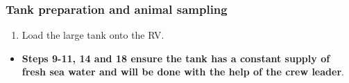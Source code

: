\documentclass[
  12pt,
]{report}
\providecommand{\tightlist}{%
  \setlength{\itemsep}{0pt}\setlength{\parskip}{0pt}}\usepackage{longtable,booktabs,array}
\begin{document}
\hypertarget{tank-preparation-and-animal-sampling}{%
\subsubsection{Tank preparation and animal
sampling}\label{tank-preparation-and-animal-sampling}}

\begin{enumerate}
\def\labelenumi{\arabic{enumi}.}
\setcounter{enumi}{7}
\tightlist
\item
  Load the large tank onto the RV.
\end{enumerate}

\begin{itemize}
\tightlist
\item
  \textbf{Steps 9-11, 14 and 18 ensure the tank has a constant supply of
  fresh sea water and will be done with the help of the crew leader}.
\end{itemize}
\end{document}

